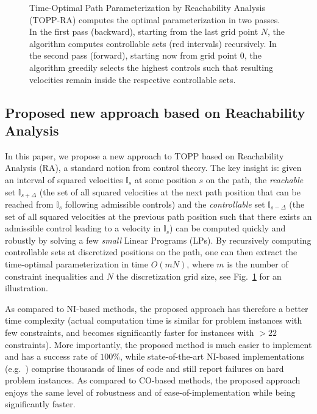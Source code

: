 \documentclass[journal]{IEEEtran}
\theoremstyle{plain}
\theoremstyle{definition}
\theoremstyle{definition}
\newcommand{\bbI}{\mathbb{I}}
\begin{document}
\begin{figure}[t]
  \caption{\label{fig:topp-ra} Time-Optimal Path Parameterization by
    Reachability Analysis (TOPP-RA) computes the optimal
    parameterization in two passes. In the first pass (backward),
    starting from the last grid point $N$, the algorithm computes
    controllable sets (red intervals) recursively. In the second pass
    (forward), starting now from grid point $0$, the algorithm
    greedily selects the highest controls such that resulting
    velocities remain inside the respective controllable sets.}
\end{figure}


\subsection*{Proposed new approach based on Reachability Analysis}

In this paper, we propose a new approach to TOPP based on Reachability
Analysis (RA), a standard notion from control theory. The key insight
is: given an interval of squared velocities $\bbI_s$ at some position $s$ on
the path, the \emph{reachable} set $\bbI_{s+\Delta}$ (the set of all
squared velocities at the next path position that can be reached from $\bbI_s$
following admissible controls) and the \emph{controllable} set
$\bbI_{s-\Delta}$ (the set of all squared velocities at the previous path
position such that there exists an admissible control leading to a
velocity in $\bbI_s$) can be computed quickly and robustly by solving
a few \emph{small} Linear Programs (LPs). By recursively computing
controllable sets at discretized positions on the path,
one can then extract the time-optimal parameterization in time
$O(mN)$, where $m$ is the number of constraint inequalities and $N$
the discretization grid size, see Fig.~\ref{fig:topp-ra} for an
illustration.

As compared to NI-based methods, the proposed approach has therefore a
better time complexity (actual computation time is similar for problem
instances with few constraints, and becomes significantly faster for
instances with $>22$ constraints). More importantly, the proposed
method is much easier to implement and has a success rate of $100\%$,
while state-of-the-art NI-based implementations
(e.g.~\cite{pham2014general}) comprise thousands of lines of code and
still report failures on hard problem instances. As compared to
CO-based methods, the proposed approach enjoys the same level of
robustness and of ease-of-implementation while being significantly
faster.
\end{document}
